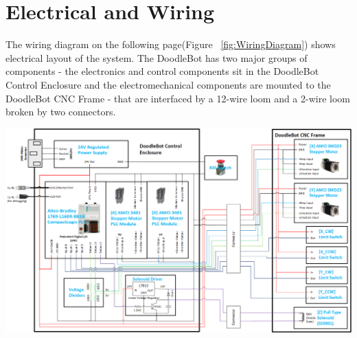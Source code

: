 \section{Electrical and Wiring}

	The wiring diagram on the following page(Figure ~\ref{fig:WiringDiagram}) shows electrical layout of the system. The DoodleBot has two major groups of components - the electronics and control components sit in the DoodleBot Control Enclosure and the electromechanical components are mounted to the DoodleBot CNC Frame - that are interfaced by a 12-wire loom and a 2-wire loom broken by two connectors.
	
\begin{landscape}
		\vspace*{\fill}
		\includegraphics[width=\hsize]{figures/cncMachine/wiring}
		\label{fig:WiringDiagram}
		\vspace*{\fill}
\end{landscape}


